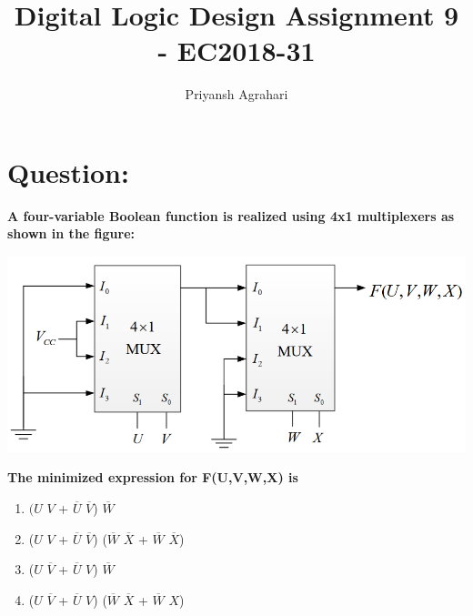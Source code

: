 \documentclass{article}
\title{Digital Logic Design Assignment 9 - EC2018-31}
\author{Priyansh Agrahari}
\begin{document}
\maketitle

\section{Question:}
\textbf{A four-variable Boolean function is realized using 4x1 multiplexers as shown in the figure:}
\vspace{1cm}
\begin{center}
\includegraphics[scale=0.3]{images/MUX_fig.png}
\end{center}
\vspace{1cm}
\textbf{The minimized expression for F(U,V,W,X) is}
\begin{enumerate}[label=(\Alph*)]
\item $(U$ $V$ + $\overline{U}$  $\overline{V}$) $\overline{W}$
\item ($U$ $V$ + $\overline{U}$ $\overline{V}$) ($\overline{W}$  $\overline{X}$ + $\overline{W}$ $\overline{X}$)
\item ($U$ $\overline{V}$ + $\overline{U}$ $V$) $\overline{W}$
\item ($U$ $\overline{V}$ + $\overline{U}$ $V$) ($\overline{W}$ $\overline{X}$ + $\overline{W}$ $X$)
\end{enumerate}

\pagebreak{}
\end{document}
